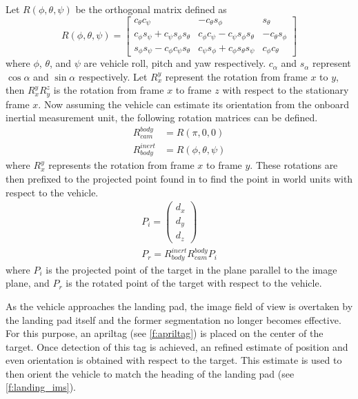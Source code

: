 Let $R\left(\phi, \theta, \psi\right)$ be the orthogonal matrix defined as
\begin{equation}
    R(\phi,\theta,\psi) = 
    \begin{bmatrix}
            c_{\theta}c_{\psi}                           & -c_{\theta}s_{\phi}                           & s_{\theta}\\
            c_{\phi}s_{\psi} + c_{\psi}s_{\phi}s_{\theta} & c_{\phi}c_{\psi} - c_{\psi}s_{\phi}s_{\theta} & -c_{\theta}s_{\phi}\\
            s_{\phi}s_{\psi} -c_{\phi}c_{\psi}s_{\theta} & c_{\psi}s_{\phi} + c_{\phi}s_{\theta}s_{\psi} & c_{\phi}c_{\theta}
    \end{bmatrix}
\end{equation}
where $\phi$, $\theta$, and $\psi$ are vehicle roll, pitch and yaw respectively. $c_{\alpha}$ and $s_{\alpha}$
represent $\cos{\alpha}$ and $\sin{\alpha}$ respectively. Let $R_x^y$ represent the rotation from frame $x$ to
$y$, then $R_x^yR_y^z$ is the rotation from frame $x$ to frame $z$ with respect to the stationary frame $x$.
Now assuming the vehicle can estimate its orientation from the onboard inertial measurement unit, the
following rotation matrices can be defined.
\begin{align}
    R_{cam}^{body}   & = R(\pi, 0, 0)\label{e:rot_cam_bod}\\
    R_{body}^{inert} & = R(\phi, \theta, \psi)\label{e:rot_body_inert}
\end{align}
where $R_{x}^{y}$ represents the rotation from frame $x$ to frame $y$. These rotations are then prefixed to the
projected point found  in  to find the point in world units with respect
to the vehicle.
\begin{align}\label{e:rotate}
    P_i = \begin{pmatrix}d_x\\d_y\\d_z\end{pmatrix}\\
    P_r = R_{body}^{inert}R_{cam}^{body}P_i
\end{align}
where $P_i$ is the projected point of the target in the plane parallel to the image plane, and $P_r$ is the
rotated point of the target with respect to the vehicle.

As the vehicle approaches the landing pad, the image field of view is overtaken by the landing pad itself and
the former segmentation no longer becomes effective. For this purpose, an apriltag\cite{olson2011tags} (see
\cref{f:apriltag}) is placed on the center of the target. Once detection of this tag is achieved, an refined
estimate of position and even orientation is obtained with respect to the target. This estimate is used to
then orient the vehicle to match the heading of the landing pad (see \cref{f:landing_ims}).

